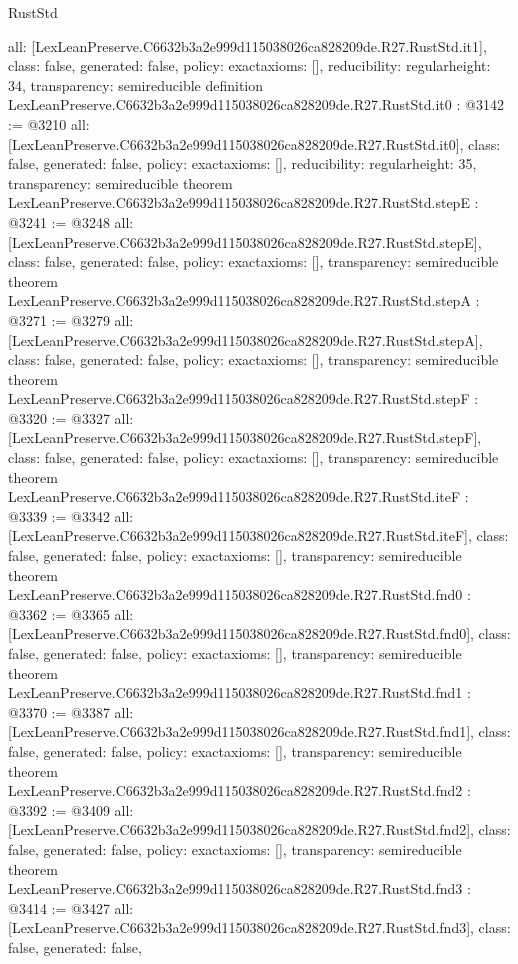 \begin{lexlean}{RustStd}
\begin{coremodule}
{  all: [LexLeanPreserve.C6632b3a2e999d115038026ca828209de.R27.RustStd.it1],
  class: false,
  generated: false,
  policy: exact{axioms: []},
  reducibility: regular{height: 34},
  transparency: semireducible
}
definition LexLeanPreserve.C6632b3a2e999d115038026ca828209de.R27.RustStd.it0 : @3142 := @3210 {
  all: [LexLeanPreserve.C6632b3a2e999d115038026ca828209de.R27.RustStd.it0],
  class: false,
  generated: false,
  policy: exact{axioms: []},
  reducibility: regular{height: 35},
  transparency: semireducible
}
theorem LexLeanPreserve.C6632b3a2e999d115038026ca828209de.R27.RustStd.stepE : @3241 := @3248 {
  all: [LexLeanPreserve.C6632b3a2e999d115038026ca828209de.R27.RustStd.stepE],
  class: false,
  generated: false,
  policy: exact{axioms: []},
  transparency: semireducible
}
theorem LexLeanPreserve.C6632b3a2e999d115038026ca828209de.R27.RustStd.stepA : @3271 := @3279 {
  all: [LexLeanPreserve.C6632b3a2e999d115038026ca828209de.R27.RustStd.stepA],
  class: false,
  generated: false,
  policy: exact{axioms: []},
  transparency: semireducible
}
theorem LexLeanPreserve.C6632b3a2e999d115038026ca828209de.R27.RustStd.stepF : @3320 := @3327 {
  all: [LexLeanPreserve.C6632b3a2e999d115038026ca828209de.R27.RustStd.stepF],
  class: false,
  generated: false,
  policy: exact{axioms: []},
  transparency: semireducible
}
theorem LexLeanPreserve.C6632b3a2e999d115038026ca828209de.R27.RustStd.iteF : @3339 := @3342 {
  all: [LexLeanPreserve.C6632b3a2e999d115038026ca828209de.R27.RustStd.iteF],
  class: false,
  generated: false,
  policy: exact{axioms: []},
  transparency: semireducible
}
theorem LexLeanPreserve.C6632b3a2e999d115038026ca828209de.R27.RustStd.fnd0 : @3362 := @3365 {
  all: [LexLeanPreserve.C6632b3a2e999d115038026ca828209de.R27.RustStd.fnd0],
  class: false,
  generated: false,
  policy: exact{axioms: []},
  transparency: semireducible
}
theorem LexLeanPreserve.C6632b3a2e999d115038026ca828209de.R27.RustStd.fnd1 : @3370 := @3387 {
  all: [LexLeanPreserve.C6632b3a2e999d115038026ca828209de.R27.RustStd.fnd1],
  class: false,
  generated: false,
  policy: exact{axioms: []},
  transparency: semireducible
}
theorem LexLeanPreserve.C6632b3a2e999d115038026ca828209de.R27.RustStd.fnd2 : @3392 := @3409 {
  all: [LexLeanPreserve.C6632b3a2e999d115038026ca828209de.R27.RustStd.fnd2],
  class: false,
  generated: false,
  policy: exact{axioms: []},
  transparency: semireducible
}
theorem LexLeanPreserve.C6632b3a2e999d115038026ca828209de.R27.RustStd.fnd3 : @3414 := @3427 {
  all: [LexLeanPreserve.C6632b3a2e999d115038026ca828209de.R27.RustStd.fnd3],
  class: false,
  generated: false,
}
\end{coremodule}
\end{lexlean}
